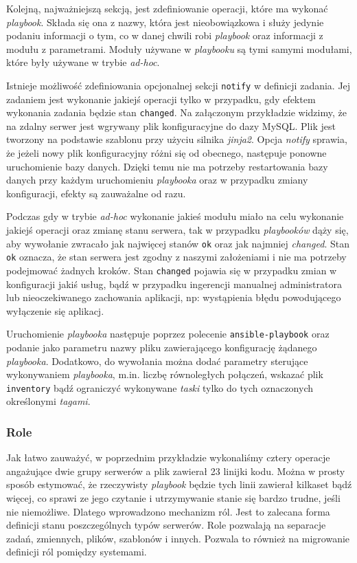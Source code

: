 Kolejną, najważniejszą sekcją, jest zdefiniowanie operacji, które ma wykonać \textit{playbook}.
Składa się ona z nazwy, która jest nieobowiązkowa i służy jedynie podaniu informacji o tym, co w danej chwili robi \textit{playbook} oraz informacji z modułu z parametrami.
Moduły używane w \textit{playbooku} są tymi samymi modułami, które były używane w trybie \textit{ad-hoc}.

Istnieje możliwość zdefiniowania opcjonalnej sekcji \texttt{notify} w definicji zadania. Jej zadaniem jest wykonanie jakiejś operacji tylko w przypadku, gdy efektem wykonania zadania będzie stan \texttt{changed}.
Na załączonym przykładzie widzimy, że na zdalny serwer jest wgrywany plik konfiguracyjne do dazy MySQL.
Plik jest tworzony na podstawie szablonu przy użyciu silnika \textit{jinja2}.
Opcja \textit{notify} sprawia, że jeżeli nowy plik konfiguracyjny różni się od obecnego, następuje ponowne uruchomienie bazy danych.
Dzięki temu nie ma potrzeby restartowania bazy danych przy każdym uruchomieniu \textit{playbooka} oraz w przypadku zmiany konfiguracji, efekty są zauważalne od razu.

Podczas gdy w trybie \textit{ad-hoc} wykonanie jakieś modułu miało na celu wykonanie jakiejś operacji oraz zmianę stanu serwera, tak w przypadku \textit{playbooków} dąży się, aby wywołanie zwracało jak najwięcej stanów \texttt{ok} oraz jak najmniej \textit{changed}.
Stan \texttt{ok} oznacza, że stan serwera jest zgodny z naszymi założeniami i nie ma potrzeby podejmować żadnych kroków.
Stan \texttt{changed} pojawia się w przypadku zmian w konfiguracji jakiś usług, bądź w przypadku ingerencji manualnej administratora lub nieoczekiwanego zachowania aplikacji, np: wystąpienia błędu powodującego wyłączenie się aplikacj.

Uruchomienie \textit{playbooka} następuje poprzez polecenie \texttt{ansible-playbook} oraz podanie jako parametru nazwy pliku zawierającego konfigurację żądanego \textit{playbooka}.
Dodatkowo, do wywołania można dodać parametry sterujące wykonywaniem \textit{playbooka}, m.in. liczbę równoległych połączeń, wskazać plik \texttt{inventory} bądź ograniczyć wykonywane \textit{taski} tylko do tych oznaczonych określonymi \textit{tagami}.
\subsubsection{Role}
Jak łatwo zauważyć, w poprzednim przykładzie wykonaliśmy cztery operacje angażujące dwie grupy serwerów a plik zawierał 23 linijki kodu.
Można w prosty sposób estymować, że rzeczywisty \textit{playbook} będzie tych linii zawierał kilkaset bądź więcej, co sprawi ze jego czytanie i utrzymywanie stanie się bardzo trudne, jeśli nie niemożliwe.
Dlatego wprowadzono mechanizm ról.
Jest to zalecana forma definicji stanu poszczególnych typów serwerów.
Role pozwalają na separacje zadań, zmiennych, plików, szablonów i innych.
Pozwala to również na migrowanie definicji ról pomiędzy systemami.

